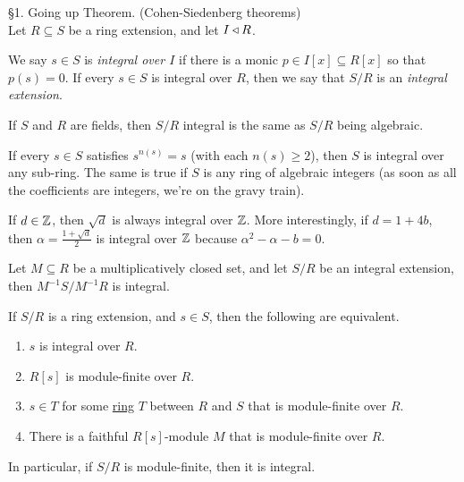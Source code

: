  \setcounter{lecture}{23}

 \S 1. Going up Theorem. (Cohen-Siedenberg theorems)\\

 Let $R\subseteq S$ be a ring extension, and let $I\triangleleft R$.
 \begin{definition}
   We say $s\in S$ is \emph{integral over $I$} if there is a monic $p\in I[x]\subseteq
   R[x]$ so that $p(s)=0$. If every $s\in S$ is integral over $R$, then we say that $S/R$
   is an \emph{integral extension}.
 \end{definition}
 \begin{example}
   If $S$ and $R$ are fields, then $S/R$ integral is the same as $S/R$ being algebraic.
 \end{example}
 \begin{example}
   If every $s\in S$ satisfies $s^{n(s)}=s$ (with each $n(s)\ge 2$), then $S$ is integral
   over any sub-ring. The same is true if $S$ is any ring of algebraic integers (as soon
   as all the coefficients are integers, we're on the gravy train).
 \end{example}
 \begin{example}
   If $d\in \mathbb{Z}$, then $\sqrt d$ is always integral over $\mathbb{Z}$. More interestingly, if
   $d=1+4b$, then $\alpha=\frac{1+\sqrt d}{2}$ is integral over $\mathbb{Z}$ because
   $\alpha^2-\alpha-b=0$.
 \end{example}
 \begin{example}
   Let $M\subseteq R$ be a multiplicatively closed set, and let $S/R$ be an integral
   extension, then $M^{-1}S/M^{-1}R$ is integral.
 \end{example}
 \begin{proposition}
   If $S/R$ is a ring extension, and $s\in S$, then the following are equivalent.
   \begin{enumerate}
     \item $s$ is integral over $R$.
     \item $R[s]$ is module-finite over $R$.
     \item $s\in T$ for some \underline{ring} $T$ between $R$ and $S$ that is
     module-finite over $R$.
     \item There is a faithful $R[s]$-module $M$ that is module-finite over $R$.
   \end{enumerate}
   In particular, if $S/R$ is module-finite, then it is integral.
 \end{proposition}
